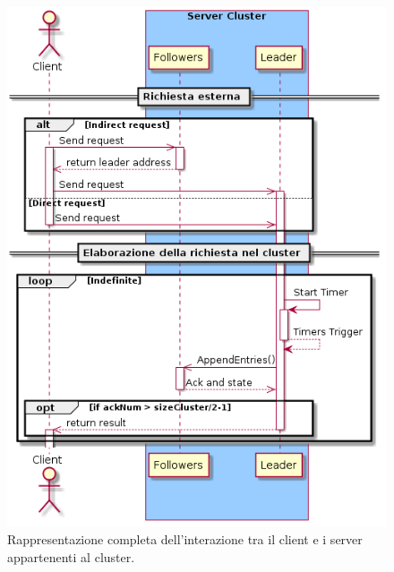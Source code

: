 	  \begin{figure}[H]
	    \centering
	    \includegraphics[width=0.90\columnwidth]{../plantuml/rendered/seqDiagrams/ClientRequest.png}
	    \caption{Rappresentazione completa dell'interazione tra il client e i server appartenenti al cluster.}
	    \label{fig:figure 14}
	  \end{figure} 
